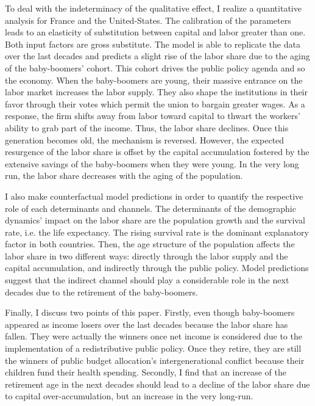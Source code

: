 To deal with the indeterminacy of the qualitative effect, I realize a quantitative analysis for France and the United-States. The calibration of the parameters leads to an elasticity of substitution between capital and labor greater than one. Both input factors are gross substitute. The model is able to replicate the data over the last decades and predicts a slight rise of the labor share due to the aging of the baby-boomers' cohort. This cohort drives the public policy agenda and so the economy. When the baby-boomers are young, their massive entrance on the labor market increases the labor supply. They also shape the institutions in their favor through their votes which permit the union to bargain greater wages. As a response, the firm shifts away from labor toward capital to thwart the workers' ability to grab part of the income. Thus, the labor share declines. Once this generation becomes old, the mechanism is reversed. However, the expected resurgence of the labor share is offset by the capital accumulation fostered by the extensive savings of the baby-boomers when they were young. In the very long run, the labor share decreases with the aging of the population.

I also make counterfactual model predictions in order to quantify the respective role of each determinants and channels. The determinants of the demographic dynamics' impact on the labor share are the population growth and the survival rate, i.e. the life expectancy. The rising survival rate is the dominant explanatory factor in both countries. Then, the age structure of the population affects the labor share in two different ways: directly through the labor supply and the capital accumulation, and indirectly through the public policy. Model predictions suggest that the indirect channel should play a considerable role in the next decades due to the retirement of the baby-boomers.

Finally, I discuss two points of this paper. Firstly, even though baby-boomers appeared as income losers over the last decades because the labor share has fallen. They were actually the winners once net income is considered due to the implementation of a redistributive public policy. Once they retire, they are still the winners of public budget allocation's intergenerational conflict because their children fund their health spending. Secondly, I find that an increase of the retirement age in the next decades should lead to a decline of the labor share due to capital over-accumulation, but an increase in the very long-run.

